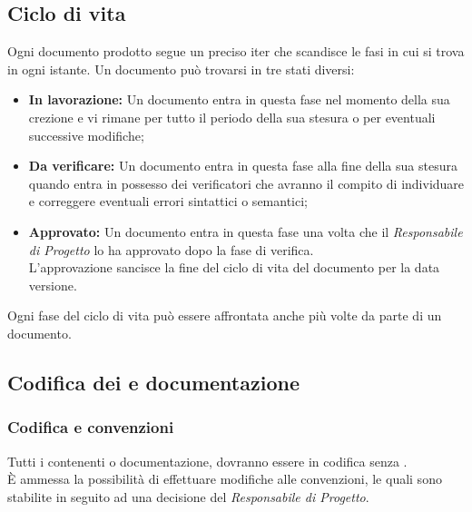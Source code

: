     \subsection{Ciclo di vita}\label{subsec:ciclovita}
      Ogni documento prodotto segue un preciso iter che scandisce le fasi in cui si trova in ogni istante. Un documento può trovarsi in tre stati diversi:\\
      \begin{itemize}
        \item \textbf{In lavorazione: }Un documento entra in questa fase nel momento della sua crezione e vi rimane per tutto il periodo della sua stesura
          o per eventuali successive modifiche;
        \item \textbf{Da verificare: }Un documento entra in questa fase alla fine della sua stesura quando entra in possesso dei verificatori che avranno il compito
          di individuare e correggere eventuali errori sintattici o semantici;
        \item \textbf{Approvato: }Un documento entra in questa fase una volta che il \emph{Responsabile di Progetto} lo ha approvato dopo la fase di verifica.\\
          L'approvazione sancisce la fine del ciclo di vita del documento per la data versione.
      \end{itemize}
      Ogni fase del ciclo di vita può essere affrontata anche più volte da parte di un documento.
\subsection{Codifica dei  e documentazione}
  \subsubsection{Codifica e convenzioni}
  Tutti i  contenenti  o documentazione, dovranno essere in codifica  senza .\\
  È ammessa la possibilità di effettuare modifiche alle convenzioni, le quali sono stabilite in seguito ad una decisione del \emph{Responsabile di Progetto}.\\


